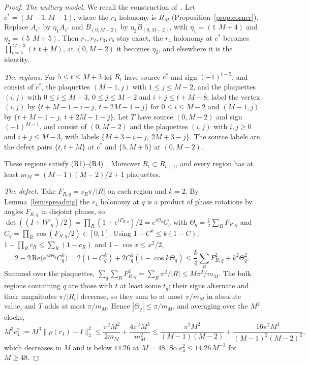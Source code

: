 \documentclass[11pt,a4paper]{article}
\theoremstyle{plain}
\theoremstyle{definition}
\theoremstyle{remark}
\begin{document}
\begin{proof}
\emph{The unitary model.} We recall the construction of~\cite[Section~6.2]{DouglasMghirbiA}. Let $c^*=(M-1,M-1)$, where the $r_4$ holonomy is $R_M$
(Proposition~\ref{prop:corner}). Replace $A_{c^*}$ by $\eta_1A_{c^*}$ and $B_{(0,M-2)}$ by $\eta_2B_{(0,M-2)}$, with $\eta_1=(1\ \,M{+}4)$ and
$\eta_2=(5\ \,M{+}5)$. Then $r_1,r_2,r_3,r_5$ stay exact, the $r_4$ holonomy at $c^*$ becomes $\prod_{t=5}^{M+3}(t\ \,t{+}M)$, at $(0,M-2)$ it becomes
$\eta_2$, and elsewhere it is the identity.

\emph{The regions.} For $5\le t\le M+3$ let $R_t$ have source $c^*$ and sign $(-1)^{t-5}$, and consist of $c^*$, the plaquettes $(M-1,j)$
with $1\le j\le M-2$, and the plaquettes $(i,j)$ with $0\le i\le M-3$, $0\le j\le M-2$ and $i+j\le t+M-8$; label the vertex $(i,j)$ by
$\{t+M-1-i-j,\ t+2M-1-j\}$ for $0\le i\le M-2$ and $(M-1,j)$ by $\{t+M-1-j,\ t+2M-1-j\}$. Let $T$ have source $(0,M-2)$ and sign
$(-1)^{M-1}$, and consist of $(0,M-2)$ and the plaquettes $(i,j)$ with $i,j\ge0$ and $i+j\le M-3$, with labels $\{M+3-i-j,\ 2M+3-j\}$.
The source labels are the defect pairs $\{t,t+M\}$ at $c^*$ and $\{5,M+5\}$ at $(0,M-2)$.

These regions satisfy (R1)--(R4)~\cite[Section~6.2]{DouglasMghirbiA}. Moreover $R_t\subset R_{t+1}$, and every region has at least
$m_M=(M-1)(M-2)/2+1$ plaquettes.

\emph{The defect.} Take $F_{R,q}=s_R\pi/|R|$ on each region and $k=2$. By Lemma~\ref{lem:spreading} the $r_4$ holonomy at $q$ is a product
of phase rotations by angles $F_{R,q}$ in disjoint planes, so $\det((I+W'_q)/2)=\prod_R(1+e^{iF_{R,q}})/2=e^{i\Theta_q}C_q$ with
$\Theta_q=\frac12\sum_RF_{R,q}$ and $C_q=\prod_R\cos(F_{R,q}/2)\in[0,1]$. Using $1-C^k\le k(1-C)$, $1-\prod_Rc_R\le\sum_R(1-c_R)$ and
$1-\cos x\le x^2/2$,
\[
2-2\,\mathrm{Re}\big(e^{ik\Theta_q}C_q^k\big)=2(1-C_q^k)+2C_q^k(1-\cos k\Theta_q)\le\frac k4\sum_RF_{R,q}^2+k^2\Theta_q^2 .
\]
Summed over the plaquettes, $\sum_q\sum_RF_{R,q}^2=\sum_R\pi^2/|R|\le M\pi^2/m_M$. The bulk regions containing $q$ are those with $t$
at least some $t_q$; their signs alternate and their magnitudes $\pi/|R_t|$ decrease, so they sum to at most $\pi/m_M$ in absolute value,
and $T$ adds at most $\pi/m_M$. Hence $|\Theta_q|\le\pi/m_M$, and averaging over the $M^2$ clocks,
\[
M^3e_4^2:=M^3\|\rho(r_4)-I\|_2^2\le\frac{\pi^2M^2}{2m_M}+\frac{4\pi^2M^3}{m_M^2}
\le\frac{\pi^2M^2}{(M-1)(M-2)}+\frac{16\pi^2M^3}{(M-1)^2(M-2)^2},
\]
which decreases in $M$ and is below $14.26$ at $M=48$. So $e_4^2\le14.26\,M^{-3}$ for $M\ge48$.


\end{proof}
\end{document}
